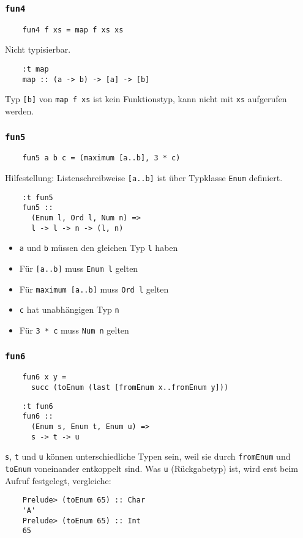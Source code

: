 \documentclass{beamer}
\begin{document}
\begin{frame}[fragile]
  \frametitle{\lstinline{fun4}}
  \begin{lstlisting}
    fun4 f xs = map f xs xs
  \end{lstlisting}
  \pause
  Nicht typisierbar.
  \begin{lstlisting}
    :t map
    map :: (a -> b) -> [a] -> [b]
  \end{lstlisting}
  Typ \lstinline{[b]} von \lstinline{map f xs} ist kein Funktionstyp,
  kann nicht mit \lstinline{xs} aufgerufen werden.
\end{frame}

\begin{frame}[fragile]
  \frametitle{\lstinline{fun5}}
  \begin{lstlisting}
    fun5 a b c = (maximum [a..b], 3 * c)
  \end{lstlisting}
  \pause
  Hilfestellung: Listenschreibweise \lstinline{[a..b]} ist über Typklasse \lstinline{Enum} definiert.
  \pause
  \begin{lstlisting}
    :t fun5
    fun5 ::
      (Enum l, Ord l, Num n) =>
      l -> l -> n -> (l, n)
  \end{lstlisting}
  \begin{itemize}
  \item \lstinline{a} und \lstinline{b} müssen den gleichen Typ \lstinline{l} haben
  \item Für \lstinline{[a..b]} muss \lstinline{Enum l} gelten
  \item Für \lstinline{maximum [a..b]} muss \lstinline{Ord l} gelten
  \item \lstinline{c} hat unabhängigen Typ \lstinline{n}
  \item Für \lstinline{3 * c} muss \lstinline{Num n} gelten
  \end{itemize}
\end{frame}

\begin{frame}[fragile]
  \frametitle{\lstinline{fun6}}
  \begin{lstlisting}
    fun6 x y =
      succ (toEnum (last [fromEnum x..fromEnum y]))
  \end{lstlisting}
  \pause
  \begin{lstlisting}
    :t fun6
    fun6 ::
      (Enum s, Enum t, Enum u) =>
      s -> t -> u
  \end{lstlisting}
  \lstinline{s}, \lstinline{t} und \lstinline{u} können unterschiedliche Typen sein,
  weil sie durch \lstinline{fromEnum} und \lstinline{toEnum} voneinander entkoppelt sind.
  Was \lstinline{u} (Rückgabetyp) ist, wird erst beim Aufruf festgelegt, vergleiche:
  \begin{lstlisting}
    Prelude> (toEnum 65) :: Char
    'A'
    Prelude> (toEnum 65) :: Int
    65
  \end{lstlisting}
\end{frame}
\end{document}

